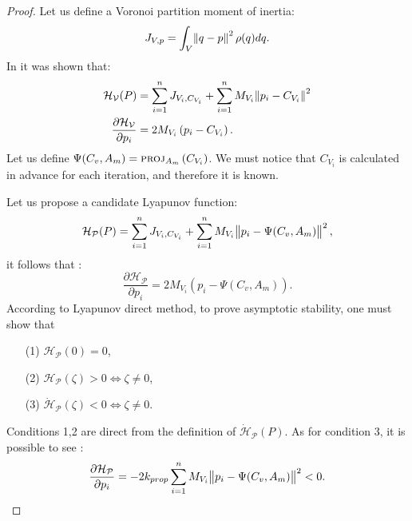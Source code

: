 \documentclass{iacas}
\begin{document}
\begin{proof}
Let us define a Voronoi partition moment of inertia:
\begin{equation}
J_{V,p} = \int_V \norm{q-p}^2 \rho(q)dq.
\end{equation}
In \cite{Cortes2004} it was shown that:
\begin{align*}
\mathcal{H}_{\mathcal{V}}(P) &= \sum_{i=1}^n J_{V_i,C_{V_i}} + \sum_{i=1}^n M_{V_i} \norm{p_i - C_{V_i}}^2\\
\frac{\partial \mathcal{H}_{\mathcal{V}}}{\partial p_i} &= 2M_{V_i}\left( p_i - C_{V_i} \right).
\end{align*}
Let us define $\Psi(C_v, A_m) = \textsc{proj}_{A_m}\left( C_{V_{i}} \right)$. We must notice that $C_{V_i}$ is calculated in advance for each iteration, and therefore it is known.

Let us propose a candidate Lyapunov function:
\begin{equation}
\mathcal{\mathcal{H}_{\mathcal{P}}}(P) = \sum_{i=1}^n J_{V_i,C_{V_i}} + \sum_{i=1}^n M_{V_i} \norm{p_i - \Psi(C_v, A_m)}^2,
\label{eq:PLA potential function}
\end{equation}
it follows that \cite{Cortes2004}:
\begin{equation}
\frac{\partial \mathcal{H}_{\mathcal{P}}}{\partial p_i} = 2M_{V_i}\left( p_i - \Psi(C_v, A_m) \right).
\end{equation}
According to Lyapunov direct method, to prove asymptotic stability, one must show that
    \begin{itemize}
        \item[(1)] $\mathcal{\mathcal{H}_{\mathcal{P}}}(0) = 0$,
        \item[(2)] $\mathcal{\mathcal{H}_{\mathcal{P}}}(\zeta) > 0 \Leftrightarrow \zeta \neq 0$,
        \item[(3)] $\dot{{\mathcal{H}}}_{\mathcal{P}}(\zeta) < 0 \Leftrightarrow \zeta \neq 0$.
    \end{itemize}
Conditions 1,2 are direct from the definition of  $\dot{\mathcal{\mathcal{H}}}_{\mathcal{P}}(P)$.
As for condition 3, it is possible to see \cite{Cortes2004}:
\begin{equation*}
\frac{\partial \mathcal{H}_{\mathcal{P}}}{\partial p_i} = -2k_{prop} \sum_{i=1}^n M_{V_i} \norm{p_i - \Psi(C_v, A_m)}^2 < 0.
\end{equation*}
\end{proof}
\end{document}
